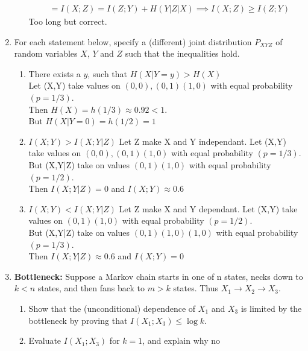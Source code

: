 \documentclass[pdftex,12pt,a4paper]{article}
\begin{document}
\begin{enumerate}
\begin{enumerate}
\begin{align}
                             &= I(X;Z) = I(Z;Y) + H(Y|Z|X) \implies I(X;Z) \ge I(Z;Y)
                \end{align}
                Too long but correct.
        \end{enumerate}
    \item For each statement below, specify a (different) joint distribution
        $P_{XYZ}$ of random variables $X$, $Y$ and $Z$ such that the
        inequalities hold.
        \begin{enumerate}
            \item There exists a $y$, such that $H(X|Y = y) > H(X)$\\
                Let (X,Y) take values on $(0,0), (0,1) (1,0)$ with equal
                probability $(p=1/3)$.\\
                Then $H(X)=h(1/3)\approx0.92 < 1$.\\
                But $H(X|Y=0)=h(1/2)=1$\\
            \item $I(X;Y) > I(X;Y|Z)$
                Let Z make X and Y independant.
                Let (X,Y) take values on $(0,0), (0,1) (1,0)$ with equal
                probability $(p=1/3)$.\\
                But (X,Y|Z) take on values $ (0,1) (1,0)$ with equal
                probability $(p=1/2)$.\\
                Then $I(X;Y|Z) = 0$ and $I(X;Y) \approx 0.6$
            \item $I(X;Y) < I(X;Y|Z)$
                Let Z make X and Y dependant.
                Let (X,Y) take values on $(0,1) (1,0)$ with equal
                probability $(p=1/2)$.\\
                But (X,Y|Z) take on values $ (0,1) (1,0) (1,0)$ with equal
                probability $(p=1/3)$.\\
                Then $I(X;Y|Z) \approx 0.6$ and $I(X;Y) = 0$
        \end{enumerate}
    \item \textbf{Bottleneck:} Suppose a Markov chain starts in one of n
        states, necks down to $k < n$ states, and then fans back to $m > k$
        states. Thus $X_1\to X_2\to X_3$.
        \begin{enumerate}
            \item Show that the (unconditional) dependence of $X_1$ and $X_3$
                is limited by the bottleneck by proving that $I(X_1;X_3) \leq \log k$.
            \item  Evaluate $I(X_1;X_3)$ for $k = 1$, and explain why no

\end{enumerate}
\end{enumerate}
\end{document}
